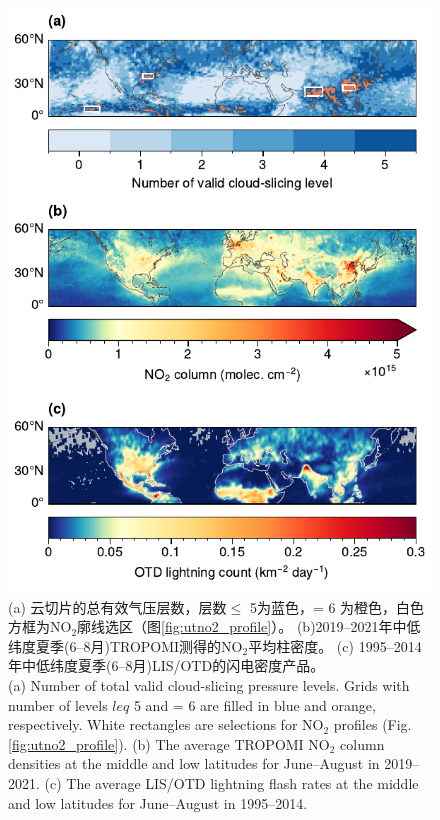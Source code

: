 \begin{figure}[!htbp]
    \centering
    \includegraphics[width=13cm]{./figures/no2_ltngcount.pdf}
    \caption{
    (a) 云切片的总有效气压层数，层数$\leq$ 5为蓝色，= 6 为橙色，白色方框为NO$_2$廓线选区（图\ref{fig:utno2_profile}）。
    (b)2019--2021年中低纬度夏季(6--8月)TROPOMI测得的NO$_2$平均柱密度。
    (c) 1995--2014年中低纬度夏季(6--8月)LIS/OTD的闪电密度产品。 \\
    (a) Number of total valid cloud-slicing pressure levels.
    Grids with number of levels $leq$ 5 and = 6 are filled in blue and orange, respectively.
    White rectangles are selections for NO$_2$ profiles (Fig. \ref{fig:utno2_profile}).
    (b) The average TROPOMI NO$_2$ column densities at the middle and low latitudes for June--August in 2019--2021.
    (c) The average LIS/OTD lightning flash rates at the middle and low latitudes for June--August in 1995--2014.
    }
    \label{fig:no2_ltngcount}
\end{figure}

